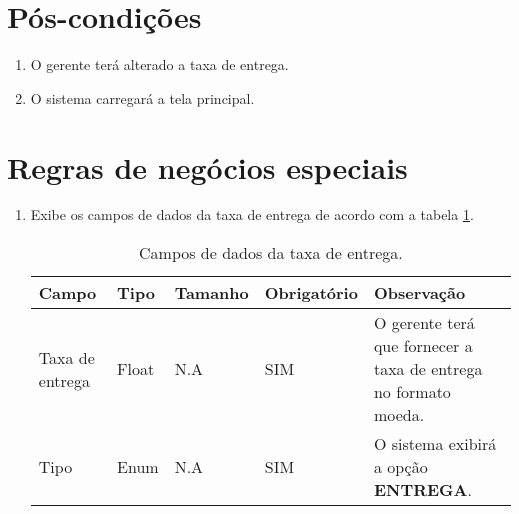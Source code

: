 \section{Pós-condições}

\begin{enumerate}
	\item O gerente terá alterado a taxa de entrega.
	\item O sistema carregará a tela principal.	
\end{enumerate}

\section{Regras de negócios especiais}

\begin{enumerate}[label=RN\arabic*]
	\item Exibe os campos de dados da taxa de entrega de acordo com a tabela \ref{uc006_tb_rn1}. \label{uc006_rn:1}
	\begin{table}[htb]
		\ABNTEXfontereduzida
		\caption[Campos de dados da taxa de entrega]{Campos de dados da taxa de entrega.}
		\label{uc006_tb_rn1}
		\begin{tabular}{|p{3.0cm}|p{2.0cm}|p{1.5cm}|p{2.0cm}|p{5.75cm}|}
			\hline
			\textbf{Campo}  & \textbf{Tipo} & \textbf{Tamanho} & \textbf{Obrigatório} & \textbf{Observação}                                             \\ \hline
			Taxa de entrega & Float         & N.A              & SIM                  & O gerente terá que fornecer a taxa de entrega no formato moeda. \\ \hline
			Tipo            & Enum          & N.A              & SIM                  & O sistema exibirá a opção \textbf{ENTREGA}.                     \\ \hline
		\end{tabular}
	\end{table}
\end{enumerate}